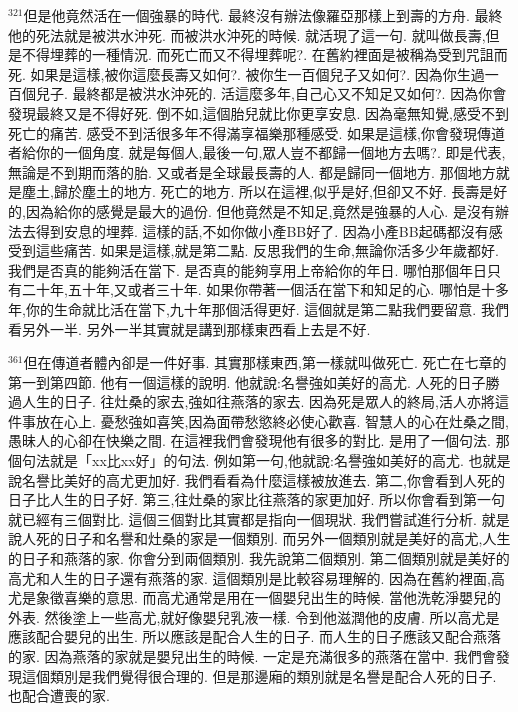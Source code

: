 \documentclass{book}
\begin{document}
$^{321}$但是他竟然活在一個強暴的時代.
最終沒有辦法像羅亞那樣上到壽的方舟.
最終他的死法就是被洪水沖死.
而被洪水沖死的時候.
就活現了這一句.
就叫做長壽,但是不得埋葬的一種情況.
而死亡而又不得埋葬呢?.
在舊約裡面是被稱為受到咒詛而死.
如果是這樣,被你這麼長壽又如何?.
被你生一百個兒子又如何?.
因為你生過一百個兒子.
最終都是被洪水沖死的.
活這麼多年,自己心又不知足又如何?.
因為你會發現最終又是不得好死.
倒不如,這個胎兒就比你更享安息.
因為毫無知覺,感受不到死亡的痛苦.
感受不到活很多年不得滿享福樂那種感受.
如果是這樣,你會發現傳道者給你的一個角度.
就是每個人,最後一句,眾人豈不都歸一個地方去嗎?.
即是代表,無論是不到期而落的胎.
又或者是全球最長壽的人.
都是歸同一個地方.
那個地方就是塵土,歸於塵土的地方.
死亡的地方.
所以在這裡,似乎是好,但卻又不好.
長壽是好的,因為給你的感覺是最大的過份.
但他竟然是不知足,竟然是強暴的人心.
是沒有辦法去得到安息的埋葬.
這樣的話,不如你做小產BB好了.
因為小產BB起碼都沒有感受到這些痛苦.
如果是這樣,就是第二點.
反思我們的生命,無論你活多少年歲都好.
我們是否真的能夠活在當下.
是否真的能夠享用上帝給你的年日.
哪怕那個年日只有二十年,五十年,又或者三十年.
如果你帶著一個活在當下和知足的心.
哪怕是十多年,你的生命就比活在當下,九十年那個活得更好.
這個就是第二點我們要留意.
我們看另外一半.
另外一半其實就是講到那樣東西看上去是不好.

$^{361}$但在傳道者體內卻是一件好事.
其實那樣東西,第一樣就叫做死亡.
死亡在七章的第一到第四節.
他有一個這樣的說明.
他就說:名譽強如美好的高尤.
人死的日子勝過人生的日子.
往灶桑的家去,強如往燕落的家去.
因為死是眾人的終局,活人亦將這件事放在心上.
憂愁強如喜笑,因為面帶愁慾終必使心歡喜.
智慧人的心在灶桑之間,愚昧人的心卻在快樂之間.
在這裡我們會發現他有很多的對比.
是用了一個句法.
那個句法就是「xx比xx好」的句法.
例如第一句,他就說:名譽強如美好的高尤.
也就是說名譽比美好的高尤更加好.
我們看看為什麼這樣被放進去.
第二,你會看到人死的日子比人生的日子好.
第三,往灶桑的家比往燕落的家更加好.
所以你會看到第一句就已經有三個對比.
這個三個對比其實都是指向一個現狀.
我們嘗試進行分析.
就是說人死的日子和名譽和灶桑的家是一個類別.
而另外一個類別就是美好的高尤,人生的日子和燕落的家.
你會分到兩個類別.
我先說第二個類別.
第二個類別就是美好的高尤和人生的日子還有燕落的家.
這個類別是比較容易理解的.
因為在舊約裡面,高尤是象徵喜樂的意思.
而高尤通常是用在一個嬰兒出生的時候.
當他洗乾淨嬰兒的外表.
然後塗上一些高尤,就好像嬰兒乳液一樣.
令到他滋潤他的皮膚.
所以高尤是應該配合嬰兒的出生.
所以應該是配合人生的日子.
而人生的日子應該又配合燕落的家.
因為燕落的家就是嬰兒出生的時候.
一定是充滿很多的燕落在當中.
我們會發現這個類別是我們覺得很合理的.
但是那邊廂的類別就是名譽是配合人死的日子.
也配合遭喪的家.
\end{document}
